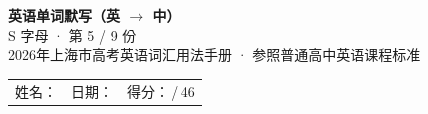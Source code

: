 \documentclass[10pt,a4paper]{article}
\begin{document}
\pagestyle{plain}

\begin{center}
{\LARGE\bfseries 英语单词默写（英 $\to$ 中）}\\[0.22em]
{\large S 字母 · 第 5 / 9 份}\\[0.18em]
{\small 2026年上海市高考英语词汇用法手册 · 参照普通高中英语课程标准}
\end{center}

\vspace{0.25em}
\noindent\begin{tabular}{@{}p{}@{}p{}@{}p{}@{}}
姓名：\underline{\hspace{2.0cm}} & 日期：\underline{\hspace{2.0cm}} & 得分：\underline{\hspace{1.3cm}}\,/\,46 \\
\end{tabular}

\vspace{0.3em}

\vspace{0.08em}
\end{document}
